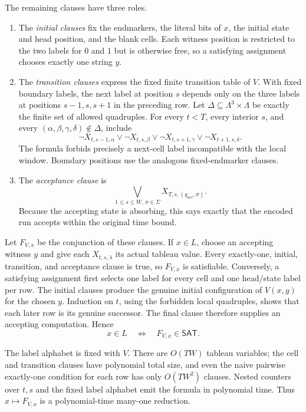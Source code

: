 The remaining clauses have three roles.

\begin{enumerate}
\item The \emph{initial clauses} fix the endmarkers, the literal bits of \(x\),
the initial state and head position, and the blank cells.  Each witness position
is restricted to the two labels for \(0\) and \(1\) but is otherwise free, so a
satisfying assignment chooses exactly one string \(y\).

\item The \emph{transition clauses} express the fixed finite transition table
of \(V\).  With fixed boundary labels, the next label at position \(s\) depends
only on the three labels at positions \(s-1,s,s+1\) in the preceding row.  Let
\(\Delta\subseteq\Lambda^3\times\Lambda\) be exactly the finite set of allowed
quadruples.  For every \(t<T\), every interior \(s\), and every
\((\alpha,\beta,\gamma,\delta)\notin\Delta\), include
\[
 \neg X_{t,s-1,\alpha}\lor
 \neg X_{t,s,\beta}\lor
 \neg X_{t,s+1,\gamma}\lor
 \neg X_{t+1,s,\delta}.
\]
The formula forbids precisely a next-cell label incompatible with the local
window.  Boundary positions use the analogous fixed-endmarker clauses.

\item The \emph{acceptance clause} is
\[
 \bigvee_{1\leq s\leq W,\,\sigma\in\Sigma}
       X_{T,s,(q_{\mathrm{acc}},\sigma)}.
\]
Because the accepting state is absorbing, this says exactly that the encoded
run accepts within the original time bound.
\end{enumerate}

Let \(F_{V,x}\) be the conjunction of these clauses.  If \(x\in L\), choose an
accepting witness \(y\) and give each \(X_{t,s,\lambda}\) its actual tableau
value.  Every exactly-one, initial, transition, and acceptance clause is true,
so \(F_{V,x}\) is satisfiable.  Conversely, a satisfying assignment first
selects one label for every cell and one head/state label per row.  The initial
clauses produce the genuine initial configuration of \(V(x,y)\) for the chosen
\(y\).  Induction on \(t\), using the forbidden local quadruples, shows that
each later row is its genuine successor.  The final clause therefore supplies
an accepting computation.  Hence
\[
 x\in L
 \quad\Longleftrightarrow\quad
 F_{V,x}\in\mathsf{SAT}.
\]

The label alphabet is fixed with \(V\).  There are \(O(TW)\) tableau variables;
the cell and transition clauses have polynomial total size, and even the naive
pairwise exactly-one condition for each row has only \(O(TW^2)\) clauses.
Nested counters over \(t,s\) and the fixed label alphabet emit the formula in
polynomial time.  Thus \(x\mapsto F_{V,x}\) is a polynomial-time many-one
reduction.

